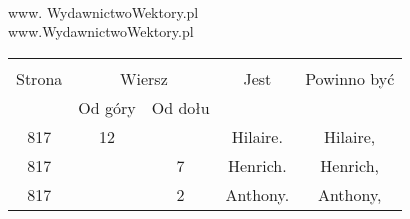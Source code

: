\documentclass[a4paper,11pt]{article}
\begin{document}
\noi
{} \\
\Jest www. WydawnictwoWektory.pl \\
\Pow  www.WydawnictwoWektory.pl \\

\vspace{\spaceTwo}







\begin{center}
  \begin{tabular}{|c|c|c|c|c|}
    \hline
    & \multicolumn{2}{c|}{} & & \\
    Strona & \multicolumn{2}{c|}{Wiersz} & Jest
                              & Powinno być \\ \cline{2-3}
    & Od góry & Od dołu & & \\
    \hline
    817 & 12 & & Hilaire. & Hilaire, \\
    817 & &  7 & Henrich. & Henrich, \\
    817 & &  2 & Anthony. & Anthony, \\

\end{tabular}
\end{center}
\end{document}
